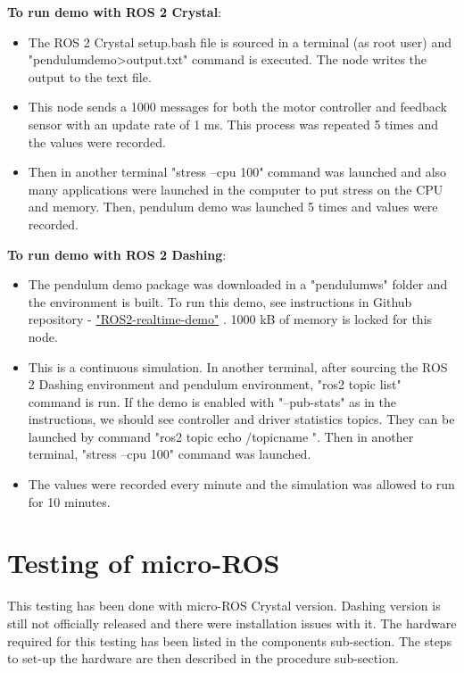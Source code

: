 \documentclass[%
xelatex,
	oneside,		%
	12pt,			%
	parskip=half,	%
	abstracton,
	chapterprefix=true%
    appendixprefix=true]
{scrbook}
\begin{document}
{\bfseries To run demo with ROS 2 Crystal}:
\begin{itemize}
\item The ROS 2 Crystal setup.bash file is sourced in a terminal (as root user) and "pendulum\textunderscore demo>output.txt" command is executed. The node writes the output to the text file.
\item This node sends a 1000 messages for both the motor controller and feedback sensor with an update rate of 1 ms. This process was repeated 5 times and the values were recorded.
\item Then in another terminal "stress --cpu 100" command was launched and also many applications were launched in the computer to put stress on the CPU and memory. Then, pendulum demo was launched 5 times and values were recorded.
\end{itemize}
{\bfseries To run demo with ROS 2 Dashing}:
\begin{itemize}
\item The pendulum demo package was downloaded in a "pendulum\textunderscore ws" folder and the environment is built. To run this demo, see instructions in Github repository - \href{https://github.com/ros2-realtime-demo/pendulum}{"ROS2-realtime-demo"} \cite{rtpendulum}. 1000 kB of memory is locked for this node.
\item This is a continuous simulation. In another terminal, after sourcing the ROS 2 Dashing environment and pendulum environment, "ros2 topic list" command is run. If the demo is enabled with "--pub-stats" as in the instructions, we should see controller and driver statistics topics. They can be launched by command "ros2 topic echo /topic\textunderscore name ". Then in another terminal, "stress --cpu 100" command was launched.
\item The values were recorded every minute and the simulation was allowed to run for 10 minutes.
\end{itemize}
\section{Testing of micro-ROS}
\vspace*{0.5cm}
This testing has been done with micro-ROS Crystal version. Dashing version is still not officially released and there were installation issues with it. The hardware required for this testing has been listed in the components sub-section. The steps to set-up the hardware are then described in the procedure sub-section.
\end{document}
